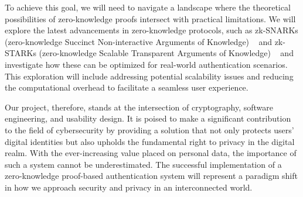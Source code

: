 To achieve this goal, we will need to navigate a landscape where the theoretical possibilities of zero-knowledge proofs intersect with practical limitations. We will explore the latest advancements in zero-knowledge protocols, such as zk-SNARKs (zero-knowledge Succinct Non-interactive Arguments of Knowledge) ~\cite{petkus2019zksnark,chen2023reviewzksnark} and zk-STARKs (zero-knowledge Scalable Transparent Arguments of Knowledge) ~\cite{berentsen2022walkthroughzkstark,cryptoeprint2018zkstark} and investigate how these can be optimized for real-world authentication scenarios. This exploration will include addressing potential scalability issues and reducing the computational overhead to facilitate a seamless user experience.

Our project, therefore, stands at the intersection of cryptography, software engineering, and usability design. It is poised to make a significant contribution to the field of cybersecurity by providing a solution that not only protects users' digital identities but also upholds the fundamental right to privacy in the digital realm. With the ever-increasing value placed on personal data, the importance of such a system cannot be underestimated. The successful implementation of a zero-knowledge proof-based authentication system will represent a paradigm shift in how we approach security and privacy in an interconnected world.
